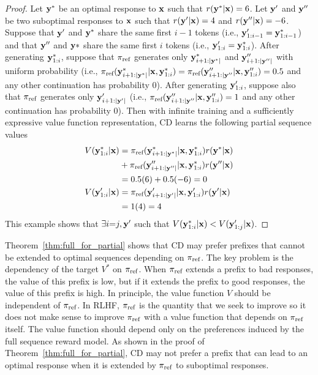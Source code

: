 \begin{proof}
Let ${\mathbf{y}}^*$ be an optimal response to ${\mathbf{x}}$ such that $r({\mathbf{y}}^*|{\mathbf{x}})=6$.  Let ${\mathbf{y}}'$ and ${\mathbf{y}}''$ be two suboptimal responses to ${\mathbf{x}}$ such that $r({\mathbf{y}}'|{\mathbf{x}})=4$ and $r({\mathbf{y}}''|{\mathbf{x}})=-6$.  Suppose that ${\mathbf{y}}'$ and ${\mathbf{y}}^*$ share the same first $i-1$ tokens (i.e., ${\mathbf{y}}'_{1:i-1} = {\mathbf{y}}^*_{1:i-1}$) and that ${\mathbf{y}}''$ and ${\mathbf{y}}*$ share the same first $i$ tokens (i.e., ${\mathbf{y}}'_{1:i} = {\mathbf{y}}^*_{1:i}$). After generating ${\mathbf{y}}^*_{1:i}$, suppose that $\pi_\text{ref}$ generates only ${\mathbf{y}}^*_{i+1:|{\mathbf{y}}^*|}$ and ${\mathbf{y}}''_{i+1:|{\mathbf{y}}''|}$ with uniform probability (i.e., $\pi_\text{ref}({\mathbf{y}}^*_{i+1:|{\mathbf{y}}^*|}|{\mathbf{x}},{\mathbf{y}}^*_{1:i})=\pi_\text{ref}({\mathbf{y}}''_{i+1:|{\mathbf{y}}''}|{\mathbf{x}},{\mathbf{y}}''_{1:i})=0.5$ and any other continuation has probability 0). After generating ${\mathbf{y}}'_{1:i}$, suppose also that $\pi_\text{ref}$ generates only ${\mathbf{y}}'_{i+1:|{\mathbf{y}}'|}$ (i.e., $\pi_\text{ref}({\mathbf{y}}''_{i+1:|{\mathbf{y}}''}|{\mathbf{x}},{\mathbf{y}}''_{1:i})=1$ and any other continuation has probability 0).  Then with infinite training and a sufficiently expressive value function representation, CD learns the following partial sequence values
\begin{align}
V({\mathbf{y}}^*_{1:i}|{\mathbf{x}}) & = \pi_\text{ref}({\mathbf{y}}^*_{i+1:|{\mathbf{y}}^*|}|{\mathbf{x}},{\mathbf{y}}^*_{1:i})r({\mathbf{y}}^*|{\mathbf{x}}) \\
& + \pi_\text{ref}({\mathbf{y}}''_{i+1:|{\mathbf{y}}''|}|{\mathbf{x}},{\mathbf{y}}^*_{1:i})r({\mathbf{y}}''|{\mathbf{x}}) \\
& = 0.5(6) + 0.5(-6) = 0 \\
V({\mathbf{y}}'_{1:i}|{\mathbf{x}}) & = \pi_\text{ref}({\mathbf{y}}'_{i+1:|{\mathbf{y}}'|}|{\mathbf{x}},{\mathbf{y}}'_{1:i})r({\mathbf{y}}'|{\mathbf{x}}) \\
& = 1(4) = 4
\end{align}
This example shows that $\exists i{=}j,{\mathbf{y}}'$ such that $V({\mathbf{y}}^*_{1:i}|{\mathbf{x}}) < V({\mathbf{y}}'_{1:j}|{\mathbf{x}})$.
\end{proof}

Theorem~\ref{thm:full_for_partial} shows that CD may prefer prefixes that cannot be extended to optimal sequences depending on $\pi_\text{ref}$.  The key problem is the dependency of the target $V^*$ on $\pi_\text{ref}$.  When $\pi_\text{ref}$ extends a prefix to bad responses, the value of this prefix is low, but if it extends the prefix to good responses, the value of this prefix is high.  In principle, the value function $V$ should be independent of $\pi_\text{ref}$.  In RLHF, $\pi_\text{ref}$ is the quantity that we seek to improve so it does not make sense to improve $\pi_\text{ref}$ with a value function that depends on $\pi_\text{ref}$ itself.  The value function should depend only on the preferences induced by the full sequence reward model.  As shown in the proof of Theorem~\ref{thm:full_for_partial}, CD may not prefer a prefix that can lead to an optimal response when it is extended by $\pi_\text{ref}$ to suboptimal responses.

